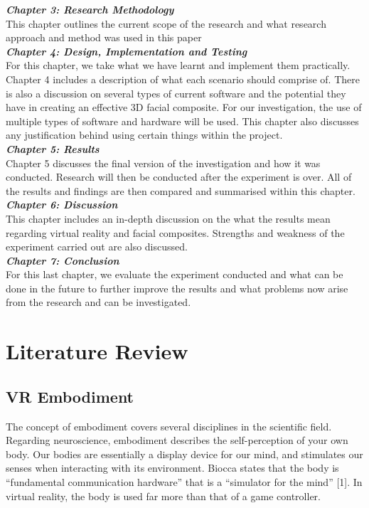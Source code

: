 \documentclass[12pt]{report}
\begin{document}
\textbf{\textit{Chapter 3: Research Methodology}}
\\

This chapter outlines the current scope of the research and what research approach and method was used in this paper
\\

\textbf{\textit{Chapter 4: Design, Implementation and Testing}}
\\

For this chapter, we take what we have learnt and implement them practically. Chapter 4 includes a description of what each scenario should comprise of. There is also a discussion on several types of current software and the potential they have in creating an effective 3D facial composite. For our investigation, the use of multiple types of software and hardware will be used.  This chapter also discusses any justification behind using certain things within the project.
\\

\textbf{\textit{Chapter 5: Results}}
\\

Chapter 5 discusses the ﬁnal version of the investigation and how it was conducted. Research will then be conducted after the experiment is over. All of the results and ﬁndings are then compared and summarised within this chapter. 
\\

\textbf{\textit{Chapter 6: Discussion}}
\\

This chapter includes an in-depth discussion on the what the results mean regarding virtual reality and facial composites. Strengths and weakness of the experiment carried out are also discussed.
\\

\textbf{\textit{Chapter 7: Conclusion}}
\\

For this last chapter, we evaluate the experiment conducted and what can be done in the future to further improve the results and what problems now arise from the research and can be investigated.

\chapter{Literature Review}
\section{VR Embodiment}
The concept of embodiment covers several disciplines in the scientific field. Regarding neuroscience, embodiment describes the self-perception of your own body. Our bodies are essentially a display device for our mind, and stimulates our senses when interacting with its environment. Biocca states that the body is “fundamental communication hardware” that is a “simulator for the mind” [1].  In virtual reality, the body is used far more than that of a game controller.
\\
\end{document}
